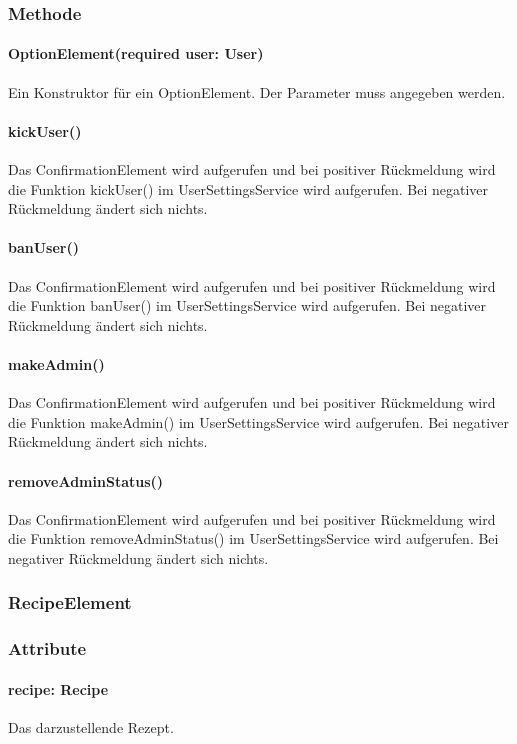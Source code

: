 \documentclass[parskip=full]{scrartcl}
\begin{document}
\subsubsection*{Methode}
\paragraph*{OptionElement(required user: User)} Ein Konstruktor für ein OptionElement. Der Parameter muss angegeben werden.
\paragraph*{kickUser()} Das ConfirmationElement wird aufgerufen und bei positiver Rückmeldung wird die Funktion kickUser() im UserSettingsService wird aufgerufen. Bei negativer Rückmeldung ändert sich nichts.
\paragraph*{banUser()} Das ConfirmationElement wird aufgerufen und bei positiver Rückmeldung wird die Funktion banUser() im UserSettingsService wird aufgerufen. Bei negativer Rückmeldung ändert sich nichts.
\paragraph*{makeAdmin()} Das ConfirmationElement wird aufgerufen und bei positiver Rückmeldung wird die Funktion makeAdmin() im UserSettingsService wird aufgerufen. Bei negativer Rückmeldung ändert sich nichts.
\paragraph*{removeAdminStatus()} Das ConfirmationElement wird aufgerufen und bei positiver Rückmeldung wird die Funktion removeAdminStatus() im UserSettingsService wird aufgerufen. Bei negativer Rückmeldung ändert sich nichts.


\subsubsection{RecipeElement} \label{sec:RecipeElement}
\subsubsection*{Attribute}
\paragraph*{recipe: Recipe} Das darzustellende Rezept.
\end{document}
